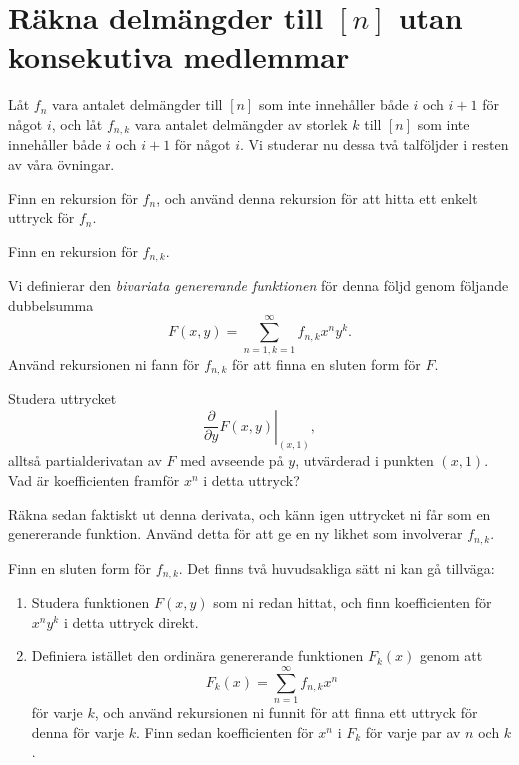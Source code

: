\documentclass[nobib]{tufte-handout}
\begin{document}
\section{Räkna delmängder till $[n]$ utan konsekutiva medlemmar}

Låt $f_n$ vara antalet delmängder till $[n]$ som inte innehåller både $i$ och $i+1$ för något $i$, och låt $f_{n,k}$ vara antalet delmängder av storlek $k$ till $[n]$ som inte innehåller både $i$ och $i+1$ för något $i$. Vi studerar nu dessa två talföljder i resten av våra övningar.

\begin{xca}\label{xca:subsetcount_easy}
    Finn en rekursion för $f_n$, och använd denna rekursion för att hitta ett enkelt uttryck för $f_n$.
\end{xca}

\begin{xca}\label{xca:subsetcount_hard_multivariate}
    Finn en rekursion för $f_{n,k}$.
    
    Vi definierar den \emph{bivariata genererande funktionen} för denna följd genom följande dubbelsumma
    $$F(x,y) = \sum_{n=1,k=1}^{\infty} f_{n,k} x^n y^k.$$
    Använd rekursionen ni fann för $f_{n,k}$ för att finna en sluten form för $F$.
\end{xca}

\begin{xca}
    Studera uttrycket
    $$\left.\frac{\partial}{\partial y} F(x,y)\right|_{(x,1)},$$
    alltså partialderivatan av $F$ med avseende på $y$, utvärderad i punkten $(x,1)$. Vad är koefficienten framför $x^n$ i detta uttryck?

    Räkna sedan faktiskt ut denna derivata, och känn igen uttrycket ni får som en genererande funktion. Använd detta för att ge en ny likhet som involverar $f_{n,k}$.
\end{xca}

\begin{xca}\label{xca:subsetcount_hard_monovariate}
    Finn en sluten form för $f_{n,k}$. Det finns två huvudsakliga sätt ni kan gå tillväga:
    \begin{enumerate}
        \item Studera funktionen $F(x,y)$ som ni redan hittat, och finn koefficienten för $x^n y^k$ i detta uttryck direkt.
        \item Definiera istället den ordinära genererande funktionen $F_k(x)$ genom att
        $$F_k(x) = \sum_{n=1}^{\infty} f_{n,k}x^n$$
        för varje $k$, och använd rekursionen ni funnit för att finna ett uttryck för denna för varje $k$. Finn sedan koefficienten för $x^n$ i $F_k$ för varje par av $n$ och $k$.
    \end{enumerate}
\end{xca}
\end{document}
